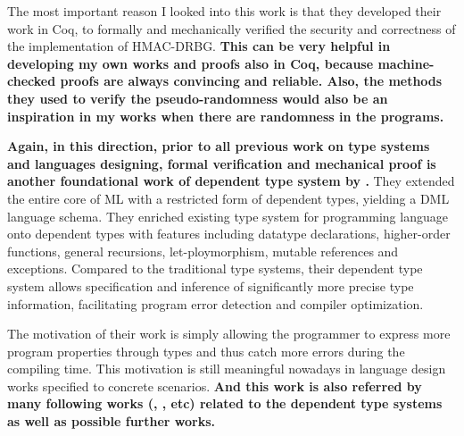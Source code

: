 \documentclass{article}
\begin{document}
The most important reason I looked into this work is that they developed their work in Coq, to formally and mechanically verified the security and correctness of the implementation of HMAC-DRBG.
\textbf{This can be very helpful in developing my own works and proofs also in Coq, because machine-checked proofs are always convincing and reliable. Also, the methods they used to verify the pseudo-randomness would also be an inspiration in my works when there are randomness in the programs.}




\textbf{Again, in this direction, prior to all previous work on type systems and languages designing, formal verification and mechanical proof is another foundational work of dependent type system by \cite{xi1999dependent}.}
They extended the entire core of ML with a restricted form of dependent types, yielding a DML language schema. They enriched existing type system for programming language onto dependent types with features including datatype declarations, higher-order functions, general recursions, let-ploymorphism, mutable references and exceptions.
Compared to the traditional type systems, their dependent type system allows specification and inference of significantly more precise type information, facilitating program error detection and compiler optimization.

The motivation of their work is simply allowing the programmer to express more program properties through types and thus catch more errors during the compiling time. This motivation is still meaningful nowadays in language design works specified to concrete scenarios. \textbf{And this work is also referred by many following works (\cite{near2019duet}, \cite{gaboardi2013linear}, \cite{reed2010distance} etc) related to the dependent type systems as well as possible further works.}
\end{document}
